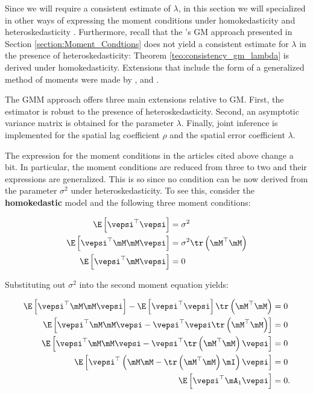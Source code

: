 \documentclass[english,12pt]{book}\usepackage[]{graphicx}\usepackage[]{xcolor}
\begin{document}
Since we will require a consistent estimate of $\lambda$, in this section we will specialized in other ways of expressing the moment conditions under homokedasticity \citep{kelejian1999generalized} and heteroskedasticity \citep{kelejian2010specification}. Furthermore, recall that the \cite{kelejian1999generalized}'s GM approach presented in Section \ref{section:Moment_Condtions} does not yield a consistent estimate for $\lambda$ in the presence of heteroskedasticity: Theorem \ref{teo:consistency_gm_lambda} is derived under homokedasticity. Extensions that include the form of a generalized method of moments were made by \cite{kelejian2010specification}, \cite{arraiz2010spatial} and \cite{drukker2013two}. 

The GMM approach offers three main extensions relative to GM. First, the estimator is robust to the presence of heteroskedasticity. Second, an asymptotic variance matrix is obtained for the parameter $\lambda$. Finally, joint inference is implemented for the spatial lag coefficient $\rho$ and the spatial error coefficient $\lambda$. 

The expression for the moment conditions in the articles cited above change a bit. In particular, the moment conditions are reduced from three to two and their expressions are generalized. This is so since no condition can be now derived from the parameter $\sigma^2$ under heteroskedasticity. To see this, consider the \textbf{homokedastic} model and the following three moment conditions:

\begin{equation*}
  \begin{aligned}
  \E\left[\vepsi^\top \vepsi\right] & = \sigma^2 \\
   \E\left[\vepsi^\top\mM\mM\vepsi\right] &= \sigma^2\tr\left(\mM^\top\mM\right) \\
   \E\left[\vepsi^\top \mM \vepsi \right] & =  0
   \end{aligned}
\end{equation*}

Substituting out $\sigma^2$ into the second moment equation yields:

\begin{equation*}
  \begin{aligned}
    \E\left[\vepsi^\top\mM\mM\vepsi\right] - \E\left[\vepsi^\top \vepsi\right] \tr\left(\mM^\top\mM\right) & = 0 \\
    \E\left[\vepsi^\top\mM\mM\vepsi - \vepsi^\top \vepsi\tr\left(\mM^\top\mM\right)\right] & = 0 \\
     \E\left[\vepsi^\top\mM\mM\vepsi - \vepsi^\top \tr\left(\mM^\top\mM\right)\vepsi\right] & = 0 \\
     \E\left[\vepsi^\top\left(\mM\mM - \tr\left(\mM^\top\mM\right)\mI\right)\vepsi\right] & = 0 \\
     \E\left[\vepsi^\top\mA_1\vepsi\right] & = 0.
  \end{aligned}
\end{equation*}
\end{document}
